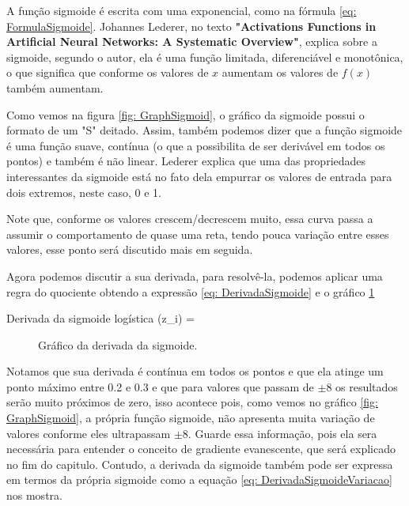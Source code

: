 A função sigmoide é escrita com uma exponencial, como na fórmula \ref{eq: FormulaSigmoide}. Johannes Lederer, no texto \textbf{"Activations Functions in Artificial Neural Networks: A Systematic Overview"}, explica sobre a sigmoide, segundo o autor, ela é uma função limitada, diferenciável e monotônica, o que significa que conforme os valores de $x$ aumentam os valores de $f(x)$ também aumentam.

Como vemos na figura \ref{fig: GraphSigmoid}, o gráfico da sigmoide possui o formato de um "S" deitado. Assim, também podemos dizer que a função sigmoide é uma função suave, contínua (o que a possibilita de ser derivável em todos os pontos) e também é não linear. Lederer explica que uma das propriedades interessantes da sigmoide está no fato dela empurrar os valores de entrada para dois extremos, neste caso, 0 e 1.

Note que, conforme os valores crescem/decrescem muito, essa curva passa a assumir o comportamento de quase uma reta, tendo pouca variação entre esses valores, esse ponto será discutido mais em seguida.

Agora podemos discutir a sua derivada, para resolvê-la, podemos aplicar uma regra do quociente obtendo a expressão \ref{eq: DerivadaSigmoide} e o gráfico \ref{fig: GraphSigmoidDerivada}

\begin{equacaodestaque}{Derivada da sigmoide logística}
    \sigma(z_i) = 
    \label{eq:sigmoide-derivada}
\end{equacaodestaque}

\begin{figure}[h!]
    \centering
    \caption{Gráfico da derivada da sigmoide.}
    \label{fig: GraphSigmoidDerivada}
\end{figure}

Notamos que sua derivada é contínua em todos os pontos e que ela atinge um ponto máximo entre 0.2 e 0.3 e que para valores que passam de $\pm 8$ os resultados serão muito próximos de zero, isso acontece pois, como vemos no gráfico \ref{fig: GraphSigmoid}, a própria função sigmoide, não apresenta muita variação de valores conforme eles ultrapassam $\pm 8$. Guarde essa informação, pois ela sera necessária para entender o conceito de gradiente evanescente, que será explicado no fim do capitulo. Contudo, a derivada da sigmoide também pode ser expressa em termos da própria sigmoide como a equação \ref{eq: DerivadaSigmoideVariacao} nos mostra.

